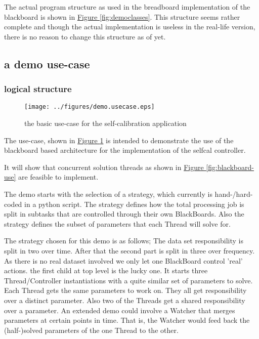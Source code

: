 \documentclass[]{lofar}
\begin{document}
      The actual program structure as used in the breadboard
      implementation of the blackboard is shown in
      \hyperlink{fig:democlasses}{Figure \ref{fig:democlasses}}. This
      structure seems rather complete and though the actual
      implementation is useless in the real-life version, there is no
      reason to change this structure as of yet.

    \subsection{a demo use-case}
    \label{sec:demo-usecase}
      \subsubsection{logical structure}
      \label{subsec:logical-structure}
      \begin{figure}
        \texttt{[image: ../figures/demo.usecase.eps]}
        \hypertarget{fig:demo-usecase}{}
        \caption{the basic use-case for the self-calibration
        application\label{fig:demo-usecase}}
      \end{figure}

      The use-case, shown in \hyperlink{fig:demo-usecase}{Figure
      \ref{fig:demo-usecase}} is intended to demonstrate the use of
      the blackboard based architecture for the implementation of the
      selfcal controller.

      It will show that concurrent solution threads as shown in
      \hyperlink{fig:blackboard-use}{Figure
      \ref{fig:blackboard-use}} are feasible to implement.

      The demo starts with the selection of a strategy, which
      currently is hand-/hard-coded in a python script. The strategy
      defines how the total processing job is split in subtasks that
      are controlled through their own BlackBoards. Also the strategy
      defines the subset of parameters that each Thread will solve
      for.

      The strategy chosen for this demo is as follows; The data set
      responsibility is split in two over time. After that the second
      part is split in three over frequency. As there is no real
      dataset involved we only let one BlackBoard control 'real'
      actions. the first child at top level is the lucky one. It
      starts three Thread/Controller instantiations with a quite
      similar set of parameters to solve. Each Thread gets the same
      parameters to work on. They all get responsibility over a
      distinct parameter. Also two of the Threads get a shared
      responsibility over a parameter. An extended demo could involve
      a Watcher that merges parameters at certain points in time. That
      is, the Watcher would feed back the (half-)solved parameters of
      the one Thread to the other.
\end{document}
